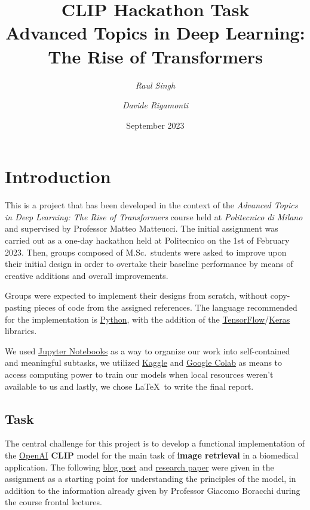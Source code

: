 \documentclass[12pt, a4paper]{article}
\title{\huge\bfseries CLIP Hackathon Task \\ \normalsize\bfseries Advanced Topics in Deep Learning: The Rise of Transformers}
\date{September 2023}
\author{\textit{Raul Singh} \and \textit{Davide Rigamonti}}
\begin{document}
\maketitle

\tableofcontents

\section{Introduction}
This is a project that has been developed in the context of the \textit{Advanced Topics in Deep Learning: The Rise of Transformers} course held at \textit{Politecnico di Milano} and supervised by Professor Matteo Matteucci.
The initial assignment was carried out as a one-day hackathon held at Politecnico on the 1st of February 2023.
Then, groups composed of M.Sc.\ students were asked to improve upon their initial design in order to overtake their baseline performance by means of creative additions and overall improvements.

Groups were expected to implement their designs from scratch, without copy-pasting pieces of code from the assigned references.
The language recommended for the implementation is \href{https://www.python.org/}{Python}, with the addition of the \href{https://www.tensorflow.org/}{TensorFlow}/\href{https://keras.io/}{Keras} libraries.

We used \href{https://jupyter.org/}{Jupyter Notebooks} as a way to organize our work into self-contained and meaningful subtasks, we utilized \href{https://www.kaggle.com/}{Kaggle} and \href{https://colab.research.google.com}{Google Colab} as means to access computing power to train our models when local resources weren't available to us and lastly, we chose \LaTeX~to write the final report.

\subsection{Task}
The central challenge for this project is to develop a functional implementation of the \href{https://openai.com/}{OpenAI} \textbf{CLIP} model for the main task of \textbf{image retrieval} in a biomedical application.
The following \href{https://openai.com/research/clip}{blog post} and \href{https://arxiv.org/pdf/2103.00020.pdf}{research paper} were given in the assignment as a starting point for understanding the principles of the model, in addition to the information already given by Professor Giacomo Boracchi during the course frontal lectures.
\end{document}
